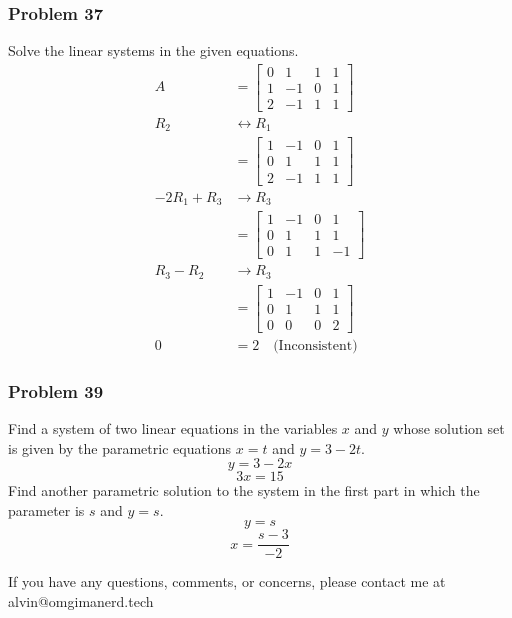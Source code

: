 \documentclass[letterpaper, 12pt]{math}
\begin{document}
\subsubsection*{Problem 37}
Solve the linear systems in the given equations.
\begin{align*}
  A &= \left[\begin{array}{ccc|c}
    0 & 1 & 1 & 1 \\
    1 & -1 & 0 & 1 \\
    2 & -1 & 1 & 1
  \end{array}\right] \\
  R_2 &\leftrightarrow R_1 \\
  &= \left[\begin{array}{ccc|c}
    1 & -1 & 0 & 1 \\
    0 & 1 & 1 & 1 \\
    2 & -1 & 1 & 1
  \end{array}\right] \\
  -2R_1+R_3 &\to R_3 \\
  &= \left[\begin{array}{ccc|c}
    1 & -1 & 0 & 1 \\
    0 & 1 & 1 & 1 \\
    0 & 1 & 1 & -1
  \end{array}\right] \\
  R_3-R_2 &\to R_3 \\
  &= \left[\begin{array}{ccc|c}
    1 & -1 & 0 & 1 \\
    0 & 1 & 1 & 1 \\
    0 & 0 & 0 & 2
  \end{array}\right] \\
  0 &= 2 \quad \text{(Inconsistent)}
\end{align*}

\subsubsection*{Problem 39}
Find a system of two linear equations in the variables \( x \) and \( y \)
whose solution set is given by the parametric equations \( x = t \) and
\( y = 3-2t \).
\[ y = 3-2x \]
\[ 3x = 15 \]
Find another parametric solution to the system in the first part in which
the parameter is \( s \) and \( y = s \).
\[ y = s \]
\[ x = \frac{s-3}{-2} \]

\begin{center}
  If you have any questions, comments, or concerns, please contact me at
  alvin@omgimanerd.tech
\end{center}
\end{document}
